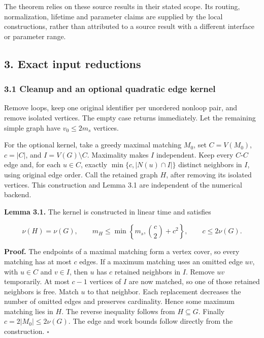 The theorem relies on these source results in their stated scope. Its routing, normalization, lifetime and parameter claims are supplied by the local constructions, rather than attributed to a source result with a different interface or parameter range.

\hypertarget{af-46593eb93e-exact-input-reductions}{%
\subsection{3. Exact input reductions}\label{af-46593eb93e-exact-input-reductions}}

\hypertarget{af-46593eb93e-cleanup-and-an-optional-quadratic-edge-kernel}{%
\subsubsection{3.1 Cleanup and an optional quadratic edge kernel}\label{af-46593eb93e-cleanup-and-an-optional-quadratic-edge-kernel}}

Remove loops, keep one original identifier per unordered nonloop pair, and remove isolated vertices. The empty case returns immediately. Let the remaining simple graph have \(v_0\leq2m_s\) vertices.

For the optional kernel, take a greedy maximal matching \(M_0\), set \(C=V(M_0)\), \(c=|C|\), and \(I=V(G)\setminus C\). Maximality makes \(I\) independent. Keep every \(C\)-\(C\) edge and, for each \(u\in C\), exactly \(\min\{c,|N(u)\cap I|\}\) distinct neighbors in \(I\), using original edge order. Call the retained graph \(H\), after removing its isolated vertices. This construction and Lemma 3.1 are independent of the numerical backend.

\textbf{Lemma 3.1.} The kernel is constructed in linear time and satisfies

\[
\nu(H)=\nu(G),\qquad
 m_H\leq\min\left\{m_s,\binom c2+c^2\right\},\qquad
 c\leq2\nu(G).
 \tag{2}
\]

\textbf{Proof.} The endpoints of a maximal matching form a vertex cover, so every matching has at most \(c\) edges. If a maximum matching uses an omitted edge \(uv\), with \(u\in C\) and \(v\in I\), then \(u\) has \(c\) retained neighbors in \(I\). Remove \(uv\) temporarily. At most \(c-1\) vertices of \(I\) are now matched, so one of those retained neighbors is free. Match \(u\) to that neighbor. Each replacement decreases the number of omitted edges and preserves cardinality. Hence some maximum matching lies in \(H\). The reverse inequality follows from \(H\subseteq G\). Finally \(c=2|M_0|\leq2\nu(G)\). The edge and work bounds follow directly from the construction. \hfill\(\square\)

